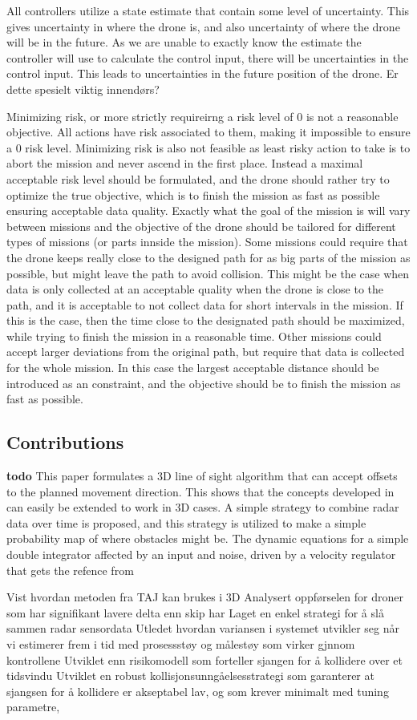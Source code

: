 All controllers utilize a state estimate that contain some level of uncertainty. This gives uncertainty in where the drone is, and also uncertainty of where the drone will be in the future. As we are unable to exactly know the estimate the controller will use to calculate the control input, there will be uncertainties in the control input. This leads to uncertainties in the future position of the drone. Er dette spesielt viktig innendørs?


Minimizing risk, or more strictly requireirng a risk level of 0  is not a reasonable objective. All actions have risk associated to them, making it impossible to ensure a 0 risk level. Minimizing risk is also not feasible as least risky action to take is to abort the mission and never ascend in the first place. Instead a  maximal acceptable risk level should be formulated, and the drone should rather try to optimize the true objective, which is to finish the mission as fast as possible ensuring acceptable data quality. Exactly what the goal of the mission is will vary between missions and the objective of the drone should be tailored for different types of missions (or parts innside the mission). Some missions could require that the drone keeps really close to the designed path for as big parts of the mission as possible, but might leave the path to avoid collision. This might be the case when data is only collected at an acceptable quality when the drone is close to the path, and it is acceptable to not collect data for short intervals in the mission. If this is the case, then the time close to the designated path should be maximized, while trying to finish the mission in a reasonable time. Other missions could accept larger deviations from the original path, but require that data is collected for the whole mission. In this case the largest acceptable distance should be introduced as an constraint, and the objective should be to finish the mission as fast as possible.

\subsection{Contributions}
 \textbf{todo}
This paper formulates a 3D line of sight algorithm that can accept offsets to the planned movement direction. This shows that the concepts developed in \cite{Johansen2016} can easily be extended to work in 3D cases. 
A simple strategy to combine radar data over time is proposed, and this strategy is utilized to make a simple probability map of where obstacles might be. 
The dynamic equations for a simple double integrator affected by an input and noise, driven by a velocity regulator that gets the refence from 


Vist hvordan metoden fra TAJ kan brukes i 3D
Analysert oppførselen for droner som har signifikant lavere delta enn skip har
Laget en enkel strategi for å slå sammen radar sensordata 
Utledet hvordan variansen i systemet utvikler seg når vi estimerer frem i tid med prosessstøy og målestøy som virker gjnnom kontrollene
Utviklet enn risikomodell som forteller sjangen for å kollidere over et tidsvindu
Utviklet en robust kollisjonsunngåelsesstrategi som garanterer  at sjangsen for å kollidere er akseptabel lav, og som krever minimalt med tuning parametre,


